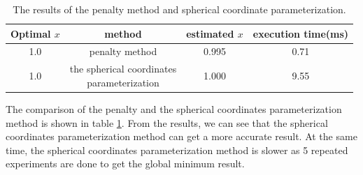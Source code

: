 \documentclass[a4paper,12pt]{article}
\begin{document}


\begin{table}[!ht]
\begin{center}
\begin{tabular}{|c|c|c|c|}
\hline
Optimal $x$& method & estimated $x$&execution time(ms)\\
\hline
1.0& penalty method&0.995&0.71\\
\hline
1.0&  \makecell{ the spherical coordinates \\parameterization}&1.000&9.55\\

\hline
\end{tabular}
\end{center}
\caption{The results of the penalty method and spherical coordinate parameterization.}
\label{tab:line}
\end{table}

The comparison of the penalty and the spherical coordinates parameterization method is shown in table \ref{tab:line}. From the results, we can see that the  spherical coordinates parameterization method  can get a more accurate result. At the same time, the spherical coordinates parameterization method is slower as 5 repeated experiments are done to get the global minimum result. \\

\end{document}
